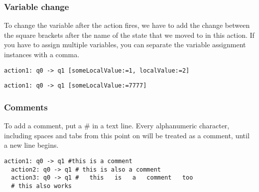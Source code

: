 \documentclass[12pt]{article}
\begin{document}
\subsubsection{Variable change}
To change the variable after the action fires, we have to add the change between the square brackets after the name of the state that we moved to in this action. If you have to assign multiple variables, you can separate the variable assignment instances with a comma.
\begin{lstlisting}[title={Action that sets the value of someLocalValue to 1 and localValue to 2.}]
  action1: q0 -> q1 [someLocalValue:=1, localValue:=2]
\end{lstlisting}
\begin{lstlisting}[title={Action that sets the value of someLocalValue to 7777.}]
  action1: q0 -> q1 [someLocalValue:=7777]
\end{lstlisting}

\subsubsection{Comments}
To add a comment, put a $\#$ in a text line. Every alphanumeric character, including spaces and tabs from this point on will be treated as a comment, until a new line begins.
\begin{lstlisting}[title={Example comments in a file.}]
  action1: q0 -> q1 #this is a comment
  action2: q0 -> q1 # this is also a comment
  action3: q0 -> q1 #   this   is   a   comment   too
  # this also works
\end{lstlisting}
\end{document}

